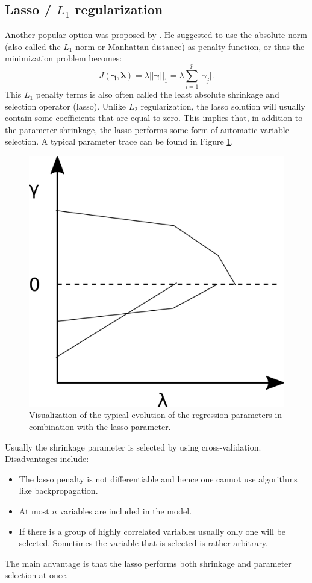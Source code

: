 \subsection{Lasso / $L_1$ regularization}
\label{sec:Lasso}
Another popular option was proposed by \cite{tibshirani_regression_1996}. He suggested to use the absolute norm (also called the $L_1$ norm or Manhattan distance) as penalty function, or thus the minimization problem becomes: \[J(\bm{\gamma},\bm{\lambda}) = \lambda \vert \vert \bm{\gamma} \vert \vert _1 = \lambda \sum_{i=1}^p \vert \gamma_j \vert.\]
This $L_1$ penalty terms is also often called the least absolute shrinkage and selection operator (lasso). Unlike $L_2$ regularization, the lasso solution will usually contain some coefficients that are equal to zero. This implies that, in addition to the parameter shrinkage, the lasso performs some form of automatic variable selection. A typical parameter trace can be found in Figure \ref{fig:LassoTrace}. \\
\begin{figure}[!htb]
\centering
\includegraphics[scale=0.75]{VectorGraphics/lassoTrace.png}
\caption{\label{fig:LassoTrace}Visualization of the typical evolution of the regression parameters in combination with the lasso parameter.}
\end{figure}

Usually the shrinkage parameter is selected by using cross-validation. Disadvantages include:
\begin{itemize}
\item The lasso penalty is not differentiable and hence one cannot use algorithms like backpropagation.
\item At most $n$ variables are included in the model.
\item If there is a group of highly correlated variables usually only one will be selected. Sometimes the variable that is selected is rather arbitrary.
\end{itemize}
The main advantage is that the lasso performs both shrinkage and parameter selection at once.

